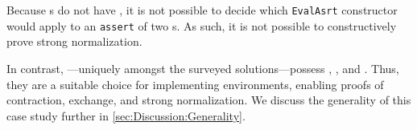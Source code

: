 Because \fpf{}s do not have \EqDec, it is not possible to decide which \texttt{EvalAsrt} constructor would
apply to an \texttt{assert} of two \fpf{}s. As such, it is not possible to constructively prove strong normalization.

In contrast, \dds---uniquely amongst the surveyed solutions---possess \SemTot, \SemInj, and \EqDec.
%
Thus, they are a suitable choice for implementing environments, enabling proofs of contraction, exchange, and strong normalization.
%
We discuss the generality of this case study further in \autoref{sec:Discussion:Generality}.
